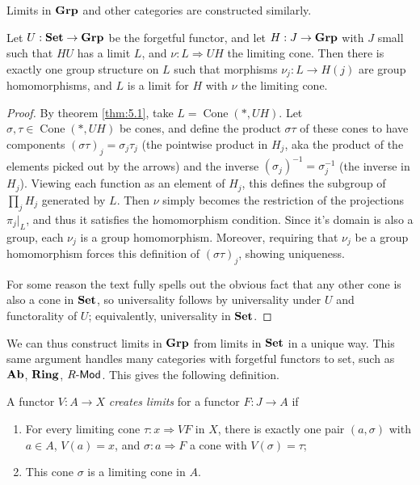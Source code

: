 Limits in $\mathbf{Grp} $ and other categories are constructed similarly.

\begin{theorem}\label{thm:5.2}
	Let $U : \mathbf{Set}  \to \mathbf{Grp} $ be the forgetful functor, and let $H : J \to \mathbf{Grp} $ with $J$ small such that $HU$ has a limit $L$, and $\nu : L \Rightarrow UH$ the limiting cone. Then there is exactly one group structure on $L$ such that morphisms $\nu _j : L \to H(j)$ are group homomorphisms, and $L$ is a limit for $H$ with $\nu $ the limiting cone.
\end{theorem}
\begin{proof}
	By theorem \ref{thm:5.1}, take $L=\operatorname{Cone} (*,UH)$.  Let $\sigma ,\tau \in \operatorname{Cone} (*,UH)$ be cones, and define the product $\sigma \tau $ of these cones to have components $(\sigma \tau )_j=\sigma _j\tau _j$ (the pointwise product in $H_j$, aka the product of the elements picked out by the arrows) and the inverse $(\sigma _j)^{-1} =\sigma _j^{-1} $ (the inverse in $H_j$). Viewing each function as an element of $H_j$, this defines the subgroup of $\prod_{j}H_j$ generated by $L$. Then $\nu $ simply becomes the restriction of the projections $\pi_j|_L$, and thus it satisfies the homomorphism condition. Since it's domain is also a group, each $\nu _j$ is a group homomorphism. Moreover, requiring that $\nu _j$ be a group homomorphism forces this definition of $(\sigma \tau )_j$, showing uniqueness.

	For some reason the text fully spells out the obvious fact that any other cone is also a cone in $\mathbf{Set} $, so universality follows by universality under $U$ and functorality of $U$; equivalently, universality in $\mathbf{Set} $.
\end{proof}

We can thus construct limits in $\mathbf{Grp} $ from limits in $\mathbf{Set} $ in a unique way. This same argument handles many categories with forgetful functors to set, such as $\mathbf{Ab}$, $\mathbf{Ring} $, $R\text{-}\mathsf{Mod}$. This gives the following definition.

\begin{definition}\label{dfn:5.2}
	A functor $V : A \to X$ \emph{creates limits} for a functor $F : J \to A$ if
	\begin{enumerate}
		\item For every limiting cone $\tau : x \Rightarrow VF$ in $X$, there is exactly one pair $(a,\sigma )$ with $a\in A$, $V(a)=x$, and $\sigma : a \Rightarrow F$ a cone with $V(\sigma) =\tau $;
		\item This cone $\sigma $ is a limiting cone in $A$.
	\end{enumerate}
\end{definition}


